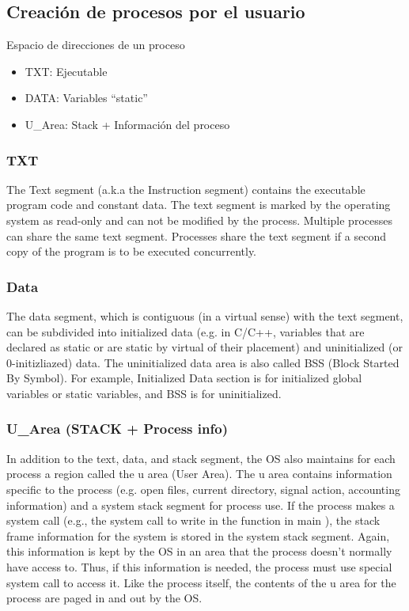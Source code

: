 \documentclass[a4paper, twoside]{article}
\begin{document}
\subsection{Creación de procesos por el usuario}
Espacio de direcciones de un proceso

\begin{itemize}
	\item TXT: Ejecutable
	\item DATA: Variables ``static''
	\item U\_Area: Stack + Información del proceso
\end{itemize}

\subsubsection{TXT}
The Text segment (a.k.a the Instruction segment) contains the executable program code and constant data. The text segment is marked by the operating system as read-only and can not be modified by the process. Multiple processes can share the same text segment. Processes share the text segment if a second copy of the program is to be executed concurrently.

\subsubsection{Data}
The data segment, which is contiguous (in a virtual sense) with the text segment, can be subdivided into initialized data (e.g. in C/C++, variables that are declared as static or are static by virtual of their placement) and uninitialized (or 0-initizliazed) data. The uninitialized data area is also called BSS (Block Started By Symbol). For example, Initialized Data section is for initialized global variables or static variables, and BSS is for uninitialized.

\subsubsection{U\_Area (STACK + Process info)}
In addition to the text, data, and stack segment, the OS also maintains for each process a region called the u area (User Area). The u area contains information specific to the process (e.g. open files, current directory, signal action, accounting information) and a system stack segment for process use. If the process makes a system call (e.g., the system call to write in the function in main ), the stack frame information for the system is stored in the system stack segment. Again, this information is kept by the OS in an area that the process doesn't normally have access to. Thus, if this information is needed, the process must use special system call to access it. Like the process itself, the contents of the u area for the process are paged in and out by the OS.
\end{document}
